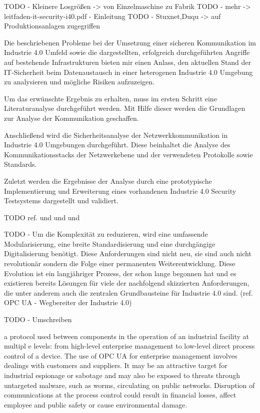 TODO - Kleinere Losgrößen -> von Einzelmaschine zu Fabrik
TODO - mehr -> leitfaden-it-security-i40.pdf - Einleitung
TODO - Stuxnet,Duqu -> auf Produktionsanlagen zugegriffen

Die beschriebenen Probleme bei der Umsetzung einer sicheren Kommunikation im Industrie 4.0 Umfeld sowie die dargestellten, erfolgreich durchgeführten Angriffe auf bestehende Infrastrukturen bieten mir einen Anlass, den aktuellen Stand der IT-Sicherheit beim Datenaustausch in einer heterogenen Industrie 4.0 Umgebung zu analysieren und mögliche Risiken aufzuzeigen.

Um das erwünschte Ergebnis zu erhalten, muss im ersten Schritt eine Literaturanalyse durchgeführt werden. Mit Hilfe dieser werden die Grundlagen zur Analyse der Kommunikation geschaffen. 

Anschließend wird die Sicherheitsanalyse der Netzwerkkommunikation in Industrie 4.0 Umgebungen durchgeführt. Diese beinhaltet die Analyse des Kommunikationsstacks der Netzwerkebene und der verwendeten Protokolle sowie Standards.

Zuletzt werden die Ergebnisse der Analyse durch eine prototypische Implementierung und Erweiterung eines vorhandenen Industrie 4.0 Security Testsystems dargestellt und validiert. 

TODO ref. \cite{Halang2016} und \cite{BMWiSuK2016} und \cite{Schleupner2016} und \cite{Sander2014}

TODO - Um die Komplexität zu reduzieren, wird eine umfassende Modularisierung, eine breite Standardisierung und eine durchgängige Digitalisierung benötigt. Diese Anforderungen sind nicht neu, sie sind auch nicht revolutionär sondern die Folge einer permanenten Weiterentwicklung. Diese Evolution ist ein langjähriger Prozess, der schon lange begonnen hat und es existieren bereits Lösungen für viele der nachfolgend skizzierten Anforderungen, die unter anderem auch die zentralen Grundbausteine für Industrie 4.0 sind. (ref. OPC UA - Wegbereiter der Industrie 4.0)

TODO - Umschreiben

a protocol used between components in the operation of an industrial facility at multipl e
levels: from high-level enterprise management to low-level direct process control of a device. The
use of OPC UA for enterprise management involves dealings with customers and suppliers. It may
be an attractive target for industrial espionage or sabotage and may also be exposed to threats
through untargeted malware, such as worms, circulating on public networks. Disruption of
communications at the process control could result in financial losses, affect employee and public
safety or cause environmental damage.